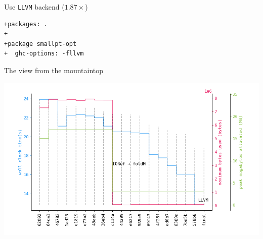 \documentclass[8pt]{beamer}
\begin{document}
\begin{frame}[fragile]{Use \texttt{LLVM} backend ($1.87\times$)}
\begin{verbatim}
+packages: .
+
+package smallpt-opt
+  ghc-options: -fllvm
\end{verbatim}
\end{frame}



\begin{frame}[fragile]{The view from the mountaintop}

\begin{center}
\includegraphics[height=0.6\textwidth]{./perfdata-gen.png}
\end{center}

\end{frame}
\end{document}
